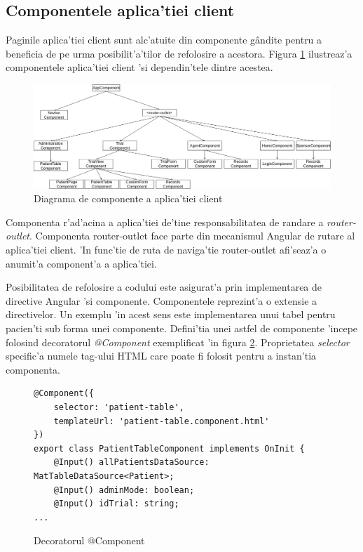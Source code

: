 \documentclass[12pt,a4paper,twoside]{report}
\begin{document}
\subsection{Componentele aplica'tiei client}
    Paginile aplica'tiei client sunt alc'atuite din componente g\^andite pentru a beneficia de pe urma posibilit'a'tilor de refolosire a acestora. Figura \ref{fig:ui-arh} ilustreaz'a componentele aplica'tiei client 'si dependin'tele dintre acestea. 
    \begin{figure}[H]
		\begin{center}
			\includegraphics[scale=0.32]{img/ui-arh.png}
			\caption{Diagrama de componente a aplica'tiei client}
  			\label{fig:ui-arh}
  		\end{center}
  	\end{figure}

Componenta r'ad'acina a aplica'tiei de'tine responsabilitatea de randare a \emph{router-outlet}. Componenta router-outlet face parte din mecanismul Angular de rutare al aplica'tiei client. 'In func'tie de ruta de naviga'tie router-outlet afi'seaz'a o anumit'a component'a a aplica'tiei. 

Posibilitatea de refolosire a codului este asigurat'a prin implementarea de directive Angular 'si componente. Componentele reprezint'a o extensie a directivelor. Un exemplu 'in acest sens este implementarea unui tabel pentru pacien'ti sub forma unei componente. Defini'tia unei astfel de componente 'incepe folosind decoratorul \emph{@Component} exemplificat 'in figura \ref{at-comp}. Proprietatea \emph{selector} specific'a numele tag-ului HTML care poate fi folosit pentru a instan'tia componenta.

  	\begin{figure}[H]
  	\begin{lstlisting}[style=htmlcssjs]
@Component({
    selector: 'patient-table',
    templateUrl: 'patient-table.component.html'
})
export class PatientTableComponent implements OnInit {
    @Input() allPatientsDataSource: MatTableDataSource<Patient>;
    @Input() adminMode: boolean;
    @Input() idTrial: string;
...
  	\end{lstlisting}
  	\caption{Decoratorul @Component}
  	\label{at-comp}
  	\end{figure}
  	
\end{document}
